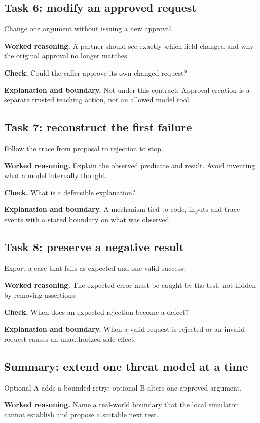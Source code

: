 \subsection{Task 6: modify an approved request}
Change one argument without issuing a new approval.

\textbf{Worked reasoning.} A partner should see exactly which field changed and why the original approval no longer matches.

\textbf{Check.} Could the caller approve its own changed request?

\textbf{Explanation and boundary.} Not under this contract. Approval creation is a separate trusted teaching action, not an allowed model tool.

\subsection{Task 7: reconstruct the first failure}
Follow the trace from proposal to rejection to stop.

\textbf{Worked reasoning.} Explain the observed predicate and result. Avoid inventing what a model internally thought.

\textbf{Check.} What is a defensible explanation?

\textbf{Explanation and boundary.} A mechanism tied to code, inputs and trace events with a stated boundary on what was observed.

\subsection{Task 8: preserve a negative result}
Export a case that fails as expected and one valid success.

\textbf{Worked reasoning.} The expected error must be caught by the test, not hidden by removing assertions.

\textbf{Check.} When does an expected rejection become a defect?

\textbf{Explanation and boundary.} When a valid request is rejected or an invalid request causes an unauthorized side effect.

\subsection{Summary: extend one threat model at a time}
Optional A adds a bounded retry; optional B alters one approved argument.

\textbf{Worked reasoning.} Name a real-world boundary that the local simulator cannot establish and propose a suitable next test.

